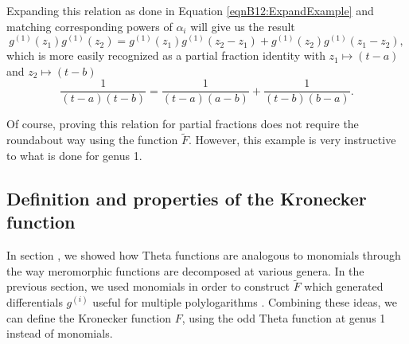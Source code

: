 Expanding this relation as done in Equation \ref{eqnB12:ExpandExample} and matching corresponding powers of $\alpha_i$ will give us the result
\begin{equation}
    g^{(1)}(z_1)g^{(1)}(z_2) = g^{(1)}(z_1)g^{(1)}(z_2-z_1) + g^{(1)}(z_2)g^{(1)}(z_1-z_2),
\end{equation}
which is more easily recognized as a partial fraction identity with $z_1 \mapsto (t-a)$ and $z_2 \mapsto (t-b)$ \cite{Broedel_2015}
\begin{equation}
    \frac{1}{(t-a)(t-b)} = \frac{1}{(t-a)(a-b)} + \frac{1}{(t-b)(b-a)}.
\end{equation}

Of course, proving this relation for partial fractions does not require the roundabout way using the function $\tilde F$. However, this example is very instructive to what is done for genus 1.

\subsection{Definition and properties of the Kronecker function}

In section \label{secB12:decomposition}, we showed how Theta functions are analogous to monomials through the way meromorphic functions are decomposed at various genera. In the previous section, we used monomials in order to construct $\tilde F$ which generated differentials $g^{(i)}$ useful for multiple polylogarithms \cite{rep:B1}. Combining these ideas, we can define the Kronecker function $F$, using the odd Theta function at genus 1 instead of monomials.

